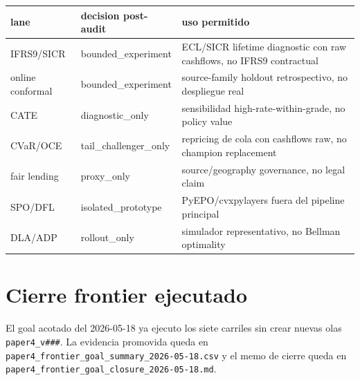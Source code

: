 \documentclass[
  spanish,
  11pt,
  letterpaper,
]{scrbook}
\newcounter{none} %
\theoremstyle{plain}
\theoremstyle{remark}
\begin{document}
{\def\LTcaptype{none} %
\begin{longtable}[]{@{}
  >{\raggedright\arraybackslash}p{}
  >{\raggedright\arraybackslash}p{}
  >{\raggedright\arraybackslash}p{}@{}}
\toprule\noalign{}
\begin{minipage}[b]{\linewidth}\raggedright
lane
\end{minipage} & \begin{minipage}[b]{\linewidth}\raggedright
decision post-audit
\end{minipage} & \begin{minipage}[b]{\linewidth}\raggedright
uso permitido
\end{minipage} \\
\midrule\noalign{}
\endhead
\bottomrule\noalign{}
\endlastfoot
IFRS9/SICR & bounded\_experiment & ECL/SICR lifetime diagnostic con raw
cashflows, no IFRS9 contractual \\
online conformal & bounded\_experiment & source-family holdout
retrospectivo, no despliegue real \\
CATE & diagnostic\_only & sensibilidad high-rate-within-grade, no policy
value \\
CVaR/OCE & tail\_challenger\_only & repricing de cola con cashflows raw,
no champion replacement \\
fair lending & proxy\_only & source/geography governance, no legal
claim \\
SPO/DFL & isolated\_prototype & PyEPO/cvxpylayers fuera del pipeline
principal \\
DLA/ADP & rollout\_only & simulador representativo, no Bellman
optimality \\
\end{longtable}
}

\section{Cierre frontier ejecutado}\label{cierre-frontier-ejecutado}

El goal acotado del 2026-05-18 ya ejecuto los siete carriles sin crear
nuevas olas \texttt{paper4\_v\#\#\#}. La evidencia promovida queda en
\texttt{paper4\_frontier\_goal\_summary\_2026-05-18.csv} y el memo de
cierre queda en \texttt{paper4\_frontier\_goal\_closure\_2026-05-18.md}.
\end{document}
